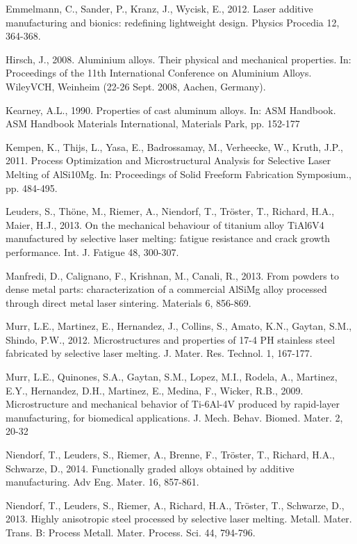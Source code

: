 \documentclass[10pt]{article}
\begin{document}
Emmelmann, C., Sander, P., Kranz, J., Wycisk, E., 2012. Laser additive manufacturing and bionics: redefining lightweight design. Physics Procedia 12, 364-368.

Hirsch, J., 2008. Aluminium alloys. Their physical and mechanical properties. In: Proceedings of the 11th International Conference on Aluminium Alloys. WileyVCH, Weinheim (22-26 Sept. 2008, Aachen, Germany).

Kearney, A.L., 1990. Properties of cast aluminum alloys. In: ASM Handbook. ASM Handbook Materials International, Materials Park, pp. 152-177

Kempen, K., Thijs, L., Yasa, E., Badrossamay, M., Verheecke, W., Kruth, J.P., 2011. Process Optimization and Microstructural Analysis for Selective Laser Melting of AlSi10Mg. In: Proceedings of Solid Freeform Fabrication Symposium., pp. 484-495.

Leuders, S., Thöne, M., Riemer, A., Niendorf, T., Tröster, T., Richard, H.A., Maier, H.J., 2013. On the mechanical behaviour of titanium alloy TiAl6V4 manufactured by selective laser melting: fatigue resistance and crack growth performance. Int. J. Fatigue 48, 300-307.

Manfredi, D., Calignano, F., Krishnan, M., Canali, R., 2013. From powders to dense metal parts: characterization of a commercial AlSiMg alloy processed through direct metal laser sintering. Materials 6, 856-869.

Murr, L.E., Martinez, E., Hernandez, J., Collins, S., Amato, K.N., Gaytan, S.M., Shindo, P.W., 2012. Microstructures and properties of 17-4 PH stainless steel fabricated by selective laser melting. J. Mater. Res. Technol. 1, 167-177.

Murr, L.E., Quinones, S.A., Gaytan, S.M., Lopez, M.I., Rodela, A., Martinez, E.Y., Hernandez, D.H., Martinez, E., Medina, F., Wicker, R.B., 2009. Microstructure and mechanical behavior of Ti-6Al-4V produced by rapid-layer manufacturing, for biomedical applications. J. Mech. Behav. Biomed. Mater. 2, 20-32

Niendorf, T., Leuders, S., Riemer, A., Brenne, F., Tröster, T., Richard, H.A., Schwarze, D., 2014. Functionally graded alloys obtained by additive manufacturing. Adv Eng. Mater. 16, 857-861.

Niendorf, T., Leuders, S., Riemer, A., Richard, H.A., Tröster, T., Schwarze, D., 2013. Highly anisotropic steel processed by selective laser melting. Metall. Mater. Trans. B: Process Metall. Mater. Process. Sci. 44, 794-796.
\end{document}
